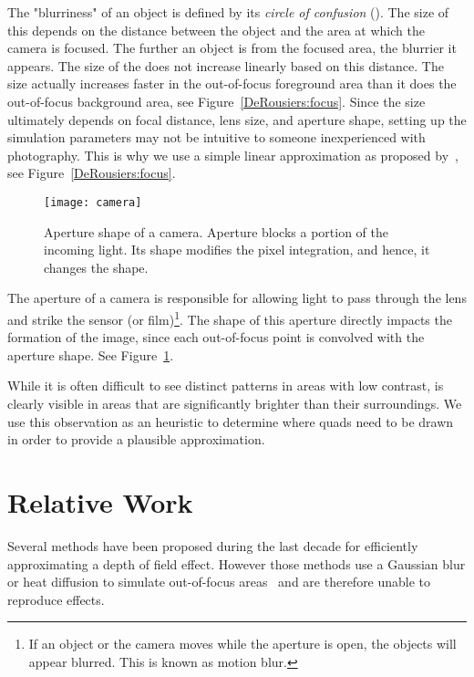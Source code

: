 The "blurriness" of an object is defined by its \emph{circle of confusion} (\coc). The size of this \coc depends on the distance between the object and the area at which the camera is focused. The further an object is from the focused area, the blurrier it appears. The size of the \coc does not increase linearly based on this distance. The size actually increases faster in the out-of-focus foreground area than it does the out-of-focus background area, see Figure~\ref{DeRousiers:focus}. Since the \coc size ultimately depends on focal distance, lens size, and aperture shape, setting up the simulation parameters may not be intuitive to someone inexperienced with photography. This is why we use a simple linear approximation as proposed by~\cite{Hammon07}, see Figure~\ref{DeRousiers:focus}.

	\begin{figure}[htb]\centering
	\texttt{[image: camera]}
	\caption{Aperture shape of a camera. Aperture blocks a portion of the incoming light. Its shape modifies the pixel integration, and hence, it changes the \bokeh shape. }
	\label{DeRousiers:camera}
	\end{figure}

The aperture of a camera is responsible for allowing light to pass through the lens and strike the sensor (or film)\footnote{If an object or the camera moves while the aperture is open, the objects will appear blurred. This is known as motion blur.}. The shape of this aperture directly impacts the formation of the image, since each out-of-focus point is convolved with the aperture shape. See Figure~\ref{DeRousiers:camera}.

While it is often difficult to see distinct \bokeh patterns in areas with low contrast, \bokeh is clearly visible in areas that are significantly brighter than their surroundings. We use this observation as an heuristic to determine where \bokeh quads need to be drawn in order to provide a plausible approximation.

\section{Relative Work}\label{Derousiers:RelativeWork}

Several methods have been proposed during the last decade for efficiently approximating a depth of field effect. However those methods use a Gaussian blur or heat diffusion to simulate out-of-focus areas~\cite{Hammon07,Kosloff07} and are therefore unable to reproduce \bokeh effects.

